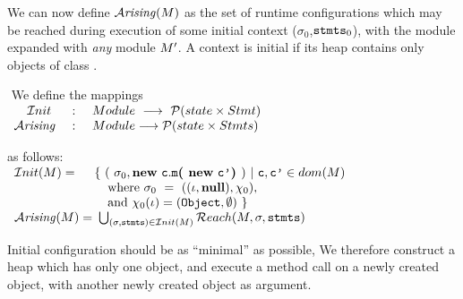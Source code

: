 {We  can now define ${\mathcal{A}}\textrm{\textit{rising}}(M)$ as the set of runtime configurations
which may be reached during execution of some initial context ($\sigma_0$,${{\textrm{\ttfamily{stmts}}}}_0$),
with the module \M expanded with {\em any} module $M'$.
 A context is initial if its heap contains only objects of class .

\begin{definition} $ $ We define the mappings \\
$\begin{array}{lcl}
{\ensuremath{ ~ }} {\hspace{.1in}} {\mathcal{I}nit} & \ : \ & {{Module}} \   \longrightarrow\  \mathcal{P}( {{state} \times {Stmt}}  )
\\
 {\mathcal{A}}\textrm{\textit{rising}} & : &  {{Module}}    \longrightarrow \mathcal{P}( {{state}} \times {Stmts}  )
\end{array}$

\noindent
as follows:\\
$\begin{array}{l@{\,}l}
 {\mathcal{I}nit}(\M)   =  &  \{ \ (\ \sigma_0, \kw{new}\ \clss{}.\prg{m}\lp\kw{new}\  \clss{'} \rp) \ |    \ \clss{},\clss{'}\in dom( \M) \\
    &  \SP  \mbox{where}\  \sigma_0\ =\ ( (\iota,\kw{null}),\chi_0), \\
    & \SP  \mbox{and}\   \chi_0(\iota)=(\prg{Object}, \emptyset)\  \}
 \\
 \Arising(\M)    =   & \    \bigcup_{ (\sigma,\code{})\in  \mathcal{I}nit (\M)}  \Reach(\M, \sigma, \code{})
\end{array}$
\end{definition}


\noindent
Initial configuration should be as ``minimal'' as possible, We therefore construct a heap which has only one object, and execute a method call on a newly created
object, with another newly created object as argument.




}
